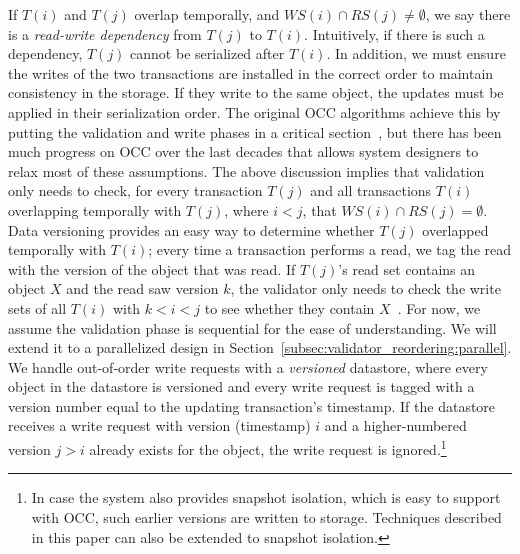 If $T(i)$ and $T(j)$ overlap temporally, and $WS(i) \cap RS(j) \neq \emptyset$, we say there is a \emph{read-write dependency} from $T(j)$ to $T(i)$. Intuitively, if there is such a dependency, $T(j)$ cannot be serialized after $T(i)$. In addition, we must ensure the writes of the two transactions are installed in the correct order to maintain consistency in the storage. If they write to the same object, the updates must be applied in their serialization order. The original OCC algorithms achieve this by putting the validation and write phases in a critical section~\cite{kung81tods}, but there has been much progress on OCC over the last decades that allows system designers to relax most of these assumptions. 
The above discussion implies that validation only needs to check, for every transaction $T(j)$ and all transactions $T(i)$ overlapping temporally with $T(j)$, where $i<j$, that $WS(i) \cap RS(j) = \emptyset$. Data versioning provides an easy way to determine whether $T(j)$ overlapped temporally with $T(i)$; every time a transaction performs a read, we tag the read with the version of the object that was read. If $T(j)$'s read set contains an object $X$ and the read saw version $k$, the validator only needs to check the write sets of all $T(i)$ with $k < i < j$ to see whether they contain $X$~\cite{ding2015centiman}.
For now, we assume the validation phase is sequential for the ease of understanding. We will extend it to a parallelized design in Section~\ref{subsec:validator_reordering:parallel}. We handle out-of-order write requests with a \emph{versioned} datastore, where every object in the datastore is versioned and every write request is tagged with a version number equal to the updating transaction's timestamp. If the datastore receives a write request with version (timestamp) $i$ and a higher-numbered version $j > i$ already exists for the object, the write request is ignored.\footnote{In case the system also provides snapshot isolation, which is easy to support with OCC, such earlier versions are written to storage. Techniques described in this paper can also be extended to snapshot isolation.} 

